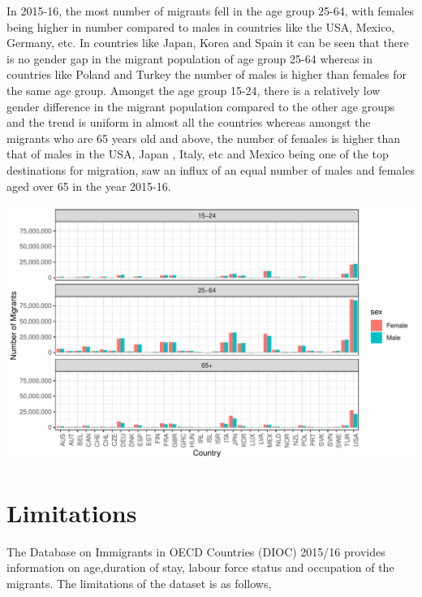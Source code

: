 \documentclass[11pt,a4paper,]{article}
\let\origfigure\figure
\let\endorigfigure\endfigure
\renewenvironment{figure}[1][2] {
    \expandafter\origfigure\expandafter[H]
} {
    \endorigfigure
}%
\begin{document}
In 2015-16, the most number of migrants fell in the age group 25-64, with females being higher in number compared to males in countries like the USA, Mexico, Germany, etc. In countries like Japan, Korea and Spain it can be seen that there is no gender gap in the migrant population of age group 25-64 whereas in countries like Poland and Turkey the number of males is higher than females for the same age group.
Amongst the age group 15-24, there is a relatively low gender difference in the migrant population compared to the other age groups and the trend is uniform in almost all the countries whereas amongst the migrants who are 65 years old and above, the number of females is higher than that of males in the USA, Japan , Italy, etc and Mexico being one of the top destinations for migration, saw an influx of an equal number of males and females aged over 65 in the year 2015-16.

\begin{figure}
\centering
\includegraphics{ETC5513assignment4_files/figure-latex/agegap-1.pdf}
\caption{\label{fig:agegap}Gender difference in migrant population across age groups in countries}
\end{figure}

\section*{Limitations}

The Database on Immigrants in OECD Countries (DIOC) 2015/16 provides information on age,duration of stay, labour force status and occupation of the migrants. The limitations of the dataset is as follows,
\end{document}
